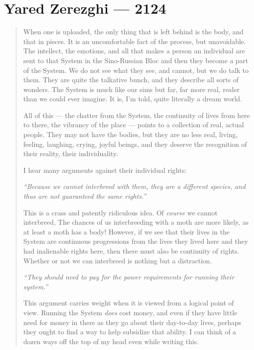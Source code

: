 \hypertarget{yared-zerezghi-2124}{%
\chapter{Yared Zerezghi — 2124}\label{yared-zerezghi-2124}}

\begin{quote}
When one is uploaded, the only thing that is left behind is the body, and that in pieces. It is an uncomfortable fact of the process, but unavoidable. The intellect, the emotions, and all that makes a person an individual are sent to that System in the Sino-Russian Bloc and then they become a part of the System. We do not see what they see, and cannot, but we do talk to them. They are quite the talkative bunch, and they describe all sorts of wonders. The System is much like our sims but far, far more real, realer than we could ever imagine. It is, I'm told, quite literally a dream world.

All of this — the chatter from the System, the continuity of lives from here to there, the vibrancy of the place — points to a collection of real, actual people. They may not have the bodies, but they are no less real, living, feeling, laughing, crying, joyful beings, and they deserve the recognition of their reality, their individuality.

I hear many arguments against their individual rights:

\emph{``Because we cannot interbreed with them, they are a different species, and thus are not guaranteed the same rights.''}

This is a crass and patently ridiculous idea. Of \emph{course} we cannot interbreed, The chances of us interbreeding with a moth are more likely, as at least a moth has a body! However, if we see that their lives in the System are continuous progressions from the lives they lived here and they had inalienable rights here, then there must also be continuity of rights. Whether or not we can interbreed is nothing but a distraction.

\emph{``They should need to pay for the power requirements for running their system.''}

This argument carries weight when it is viewed from a logical point of view. Running the System \emph{does} cost money, and even if they have little need for money in there as they go about their day-to-day lives, perhaps they ought to find a way to help subsidize that ability. I can think of a dozen ways off the top of my head even while writing this.


\end{quote}
